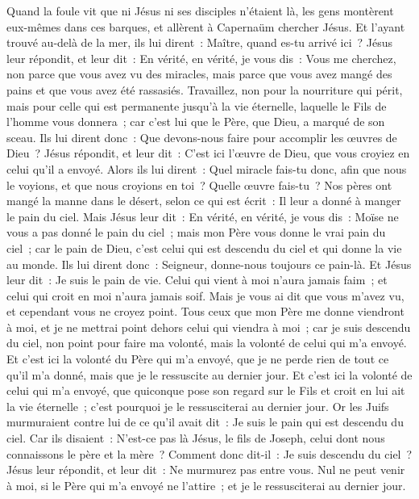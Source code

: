 \begin{multicols}{2}
Quand la foule vit que ni Jésus ni ses disciples n'étaient là, les gens montèrent eux-mêmes dans ces barques, et allèrent à Capernaüm chercher Jésus.
Et l'ayant trouvé au-delà de la mer, ils lui dirent~: Maître, quand es-tu arrivé ici~?
Jésus leur répondit, et leur dit~: En vérité, en vérité, je vous dis~: Vous me cherchez, non parce que vous avez vu des miracles, mais parce que vous avez mangé des pains et que vous avez été rassasiés.
Travaillez, non pour la nourriture qui périt, mais pour celle qui est permanente jusqu'à la vie éternelle, laquelle le Fils de l'homme vous donnera~; car c'est lui que le Père, que Dieu, a marqué de son sceau.
Ils lui dirent donc~: Que devons-nous faire pour accomplir les œuvres de Dieu~?
Jésus répondit, et leur dit~: C'est ici l'œuvre de Dieu, que vous croyiez en celui qu'il a envoyé.
Alors ils lui dirent~: Quel miracle fais-tu donc, afin que nous le voyions, et que nous croyions en toi~? Quelle œuvre fais-tu~?
Nos pères ont mangé la manne dans le désert, selon ce qui est écrit~: Il leur a donné à manger le pain du ciel.
Mais Jésus leur dit~: En vérité, en vérité, je vous dis~: Moïse ne vous a pas donné le pain du ciel~; mais mon Père vous donne le vrai pain du ciel~;
car le pain de Dieu, c'est celui qui est descendu du ciel et qui donne la vie au monde.
Ils lui dirent donc~: Seigneur, donne-nous toujours ce pain-là.
Et Jésus leur dit~: Je suis le pain de vie. Celui qui vient à moi n'aura jamais faim~; et celui qui croit en moi n'aura jamais soif.
Mais je vous ai dit que vous m'avez vu, et cependant vous ne croyez point.
Tous ceux que mon Père me donne viendront à moi, et je ne mettrai point dehors celui qui viendra à moi~;
car je suis descendu du ciel, non point pour faire ma volonté, mais la volonté de celui qui m'a envoyé.
Et c'est ici la volonté du Père qui m'a envoyé, que je ne perde rien de tout ce qu'il m'a donné, mais que je le ressuscite au dernier jour.
Et c'est ici la volonté de celui qui m'a envoyé, que quiconque pose son regard sur le Fils et croit en lui ait la vie éternelle~; c'est pourquoi je le ressusciterai au dernier jour.
Or les Juifs murmuraient contre lui de ce qu'il avait dit~: Je suis le pain qui est descendu du ciel.
Car ils disaient~: N'est-ce pas là Jésus, le fils de Joseph, celui dont nous connaissons le père et la mère~? Comment donc dit-il~: Je suis descendu du ciel~?
Jésus leur répondit, et leur dit~: Ne murmurez pas entre vous.
Nul ne peut venir à moi, si le Père qui m'a envoyé ne l'attire~; et je le ressusciterai au dernier jour.

\end{multicols}
